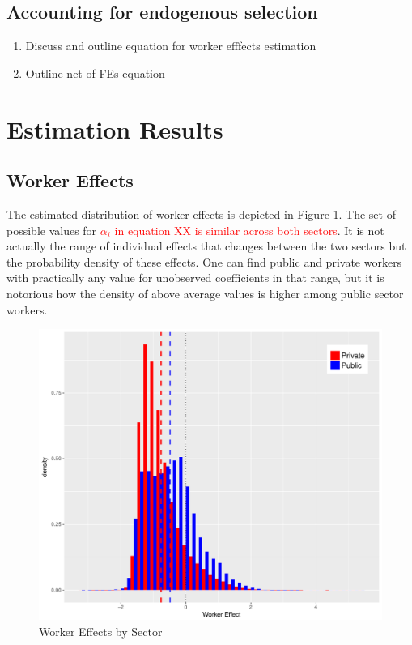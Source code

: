 \documentclass{article}
\begin{document}
\subsection{Accounting for endogenous selection}
\begin{enumerate}
    \item Discuss \cite{canay_simple_2011} and outline equation for worker efffects estimation
    \item Outline net of FEs equation 
\end{enumerate}

\section{Estimation Results}
\subsection{Worker Effects}
The estimated distribution of worker effects is depicted in Figure \ref{fig:we}. The set of possible values for \textcolor{red}{$\alpha_i$ in equation XX is similar across both sectors}. It is not actually the range of individual effects that changes between the two sectors but the probability density of these effects. One can find public and private workers with practically any value for unobserved coefficients in that range, but it is notorious how the density of above average values is higher among public sector workers.\\

\begin{figure}[h!]\label{fig:we}
  \caption{Worker Effects by Sector}
  \includegraphics[scale=0.7]{graphs/001_fe_sector_onepc.pdf}
\end{figure}
\end{document}
